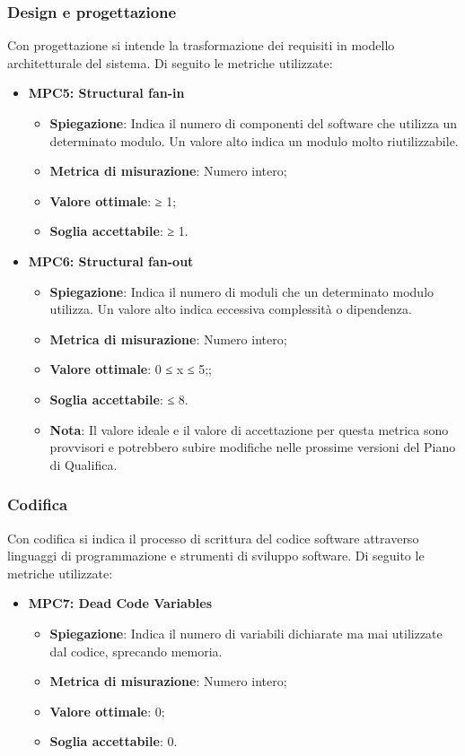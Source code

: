\subsubsection{Design e progettazione}
Con progettazione si intende la trasformazione dei requisiti in modello architetturale del sistema. Di seguito le metriche utilizzate:
\begin{itemize}
    \item \textbf{MPC5: Structural fan-in}
    \begin{itemize}
        \item \textbf{Spiegazione}: Indica il numero di componenti del software che utilizza un determinato modulo. Un valore alto indica un modulo molto riutilizzabile.
        \item \textbf{Metrica di misurazione}: Numero intero;
        \item \textbf{Valore ottimale}: ≥ 1;
        \item \textbf{Soglia accettabile}: ≥ 1.
    \end{itemize}
    \item \textbf{MPC6: Structural fan-out}
    \begin{itemize}
        \item \textbf{Spiegazione}: Indica il numero di moduli che un determinato modulo utilizza. Un valore alto indica eccessiva complessità o dipendenza.
        \item \textbf{Metrica di misurazione}: Numero intero;
        \item \textbf{Valore ottimale}: 0 ≤ x ≤ 5;; 
        \item \textbf{Soglia accettabile}: ≤ 8. 
        \item \textbf{Nota}: Il valore ideale e il valore di accettazione per questa metrica sono provvisori e potrebbero subire modifiche nelle prossime versioni del Piano di Qualifica.
    \end{itemize}
\end{itemize}

\subsubsection{Codifica}
Con codifica si indica il processo di scrittura del codice software attraverso linguaggi di programmazione e strumenti di sviluppo software. Di seguito le metriche utilizzate:
\begin{itemize}
    \item \textbf{MPC7: Dead Code Variables}
    \begin{itemize}
        \item \textbf{Spiegazione}: Indica il numero di variabili dichiarate ma mai utilizzate dal codice, sprecando memoria.
        \item \textbf{Metrica di misurazione}: Numero intero;
        \item \textbf{Valore ottimale}: 0;
        \item \textbf{Soglia accettabile}: 0.
    \end{itemize}
\end{itemize}


